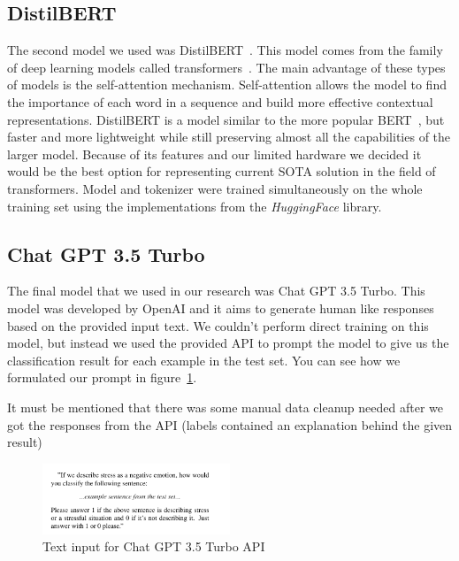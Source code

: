 \documentclass[10pt, a4paper]{article}
\begin{document}
\subsection{DistilBERT}
The second model we used was DistilBERT~\citep{sanh2020distilbert}.
This model comes from the family of deep learning models called transformers~\citep{vaswani2017attention}.
The main advantage of these types of models is the self-attention mechanism.
Self-attention allows the model to find the importance of each word in a sequence and build more effective contextual representations.
\hfill \break
\hfill \break
DistilBERT is a model similar to the more popular BERT~\citep{devlin2019bert}, but faster and more lightweight while still preserving almost all the capabilities of the larger model.
Because of its features and our limited hardware we decided it would be the best option for representing current SOTA solution in the field of transformers.
Model and tokenizer were trained simultaneously on the whole training set using the implementations from the \textit{HuggingFace} library.





\subsection{Chat GPT 3.5 Turbo}
The final model that we used in our research was Chat GPT 3.5 Turbo.
This model was developed by OpenAI and it aims to generate human like responses based on the provided input text.
We couldn't perform direct training on this model, but instead we used the provided API to prompt the model to give us the classification result for each example in the test set.
You can see how we formulated our prompt in figure~\ref{fig:chat-gpt-prompt}.

It must be mentioned that there was some manual data cleanup needed after we got the responses from the API (labels contained an explanation behind the given result)

\begin{figure}
    \centering
    \includegraphics[width=0.5\textwidth]{images/chat-gpt-prompt}
    \caption{Text input for Chat GPT 3.5 Turbo API}
    \label{fig:chat-gpt-prompt}
\end{figure}
\end{document}
